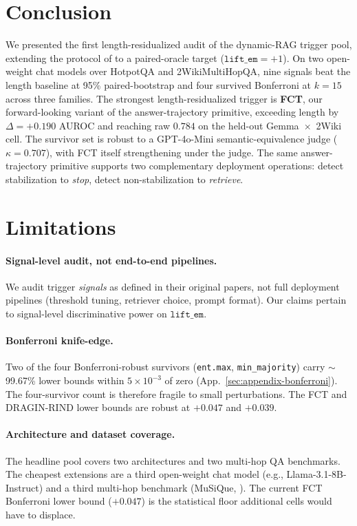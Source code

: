 \documentclass[11pt]{article}
\begin{document}
\section{Conclusion}
\label{sec:conclusion}

We presented the first length-residualized audit of the dynamic-RAG trigger pool, extending the protocol of \citet{vashurin_uncertainty-line_2025} to a paired-oracle target ($\texttt{lift\_em}{=}+1$). On two open-weight chat models over HotpotQA and 2WikiMultiHopQA, nine signals beat the length baseline at 95\% paired-bootstrap and four survived Bonferroni at $k{=}15$ across three families. The strongest length-residualized trigger is \textbf{FCT}, our forward-looking variant of the answer-trajectory primitive, exceeding length by $\Delta = +0.190$ AUROC and reaching raw $0.784$ on the held-out Gemma~$\times$~2Wiki cell. The survivor set is robust to a GPT-4o-Mini semantic-equivalence judge ($\kappa = 0.707$), with FCT itself strengthening under the judge. The same answer-trajectory primitive supports two complementary deployment operations: detect stabilization to \emph{stop}, detect non-stabilization to \emph{retrieve}.

\section*{Limitations}
\label{sec:limitations}

\paragraph{Signal-level audit, not end-to-end pipelines.} We audit trigger \emph{signals} as defined in their original papers, not full deployment pipelines (threshold tuning, retriever choice, prompt format). Our claims pertain to signal-level discriminative power on $\texttt{lift\_em}$.

\paragraph{Bonferroni knife-edge.} Two of the four Bonferroni-robust survivors (\texttt{ent.max}, \texttt{min\_majority}) carry $\sim$99.67\% lower bounds within $5{\times}10^{-3}$ of zero (App.~\ref{sec:appendix-bonferroni}). The four-survivor count is therefore fragile to small perturbations. The FCT and DRAGIN-RIND lower bounds are robust at $+0.047$ and $+0.039$.

\paragraph{Architecture and dataset coverage.} The headline pool covers two architectures and two multi-hop QA benchmarks. The cheapest extensions are a third open-weight chat model (e.g., Llama-3.1-8B-Instruct) and a third multi-hop benchmark (MuSiQue, \citealp{trivedi__2022}). The current FCT Bonferroni lower bound ($+0.047$) is the statistical floor additional cells would have to displace.
\end{document}
